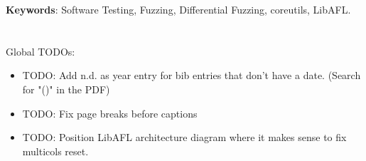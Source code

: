 \documentclass{article}
\begin{document}
\begin{center}
    \vspace{70px}

    \begin{minipage}{0.7\textwidth}
        \textbf{Keywords}: Software Testing, Fuzzing, Differential Fuzzing, coreutils, LibAFL.
        \\\\\\Global TODOs:
        \begin{itemize}
            \item TODO: Add n.d. as year entry for bib entries that don't have a date. (Search for "()" in the PDF)
            \item TODO: Fix page breaks before captions
            \item TODO: Position LibAFL architecture diagram where it makes sense to fix multicols reset.
        \end{itemize}
    \end{minipage}
\end{center}

\clearpage\newpage
\end{document}
